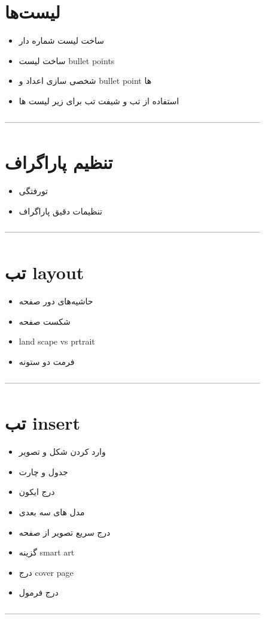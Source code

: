 \section{لیست‌ها}
\begin{itemize}
\item
ساخت لیست شماره دار
\item
ساخت لیست bullet points
\item
شخصی سازی اعداد و bullet point ها
\item
استفاده از تب و شیفت تب برای زیر لیست ها
\end{itemize}
--------------------------------------------------------------------------------------------
\section{تنظیم پاراگراف}
\begin{itemize}
\item
تورفتگی
\item
تنظیمات دقیق پاراگراف
\end{itemize}
--------------------------------------------------------------------------------------------
\section{تب layout}
\begin{itemize}
\item
حاشیه‌های دور صفحه
\item
شکست صفحه
\item
land scape vs prtrait
\item
فرمت دو ستونه
\end{itemize}
--------------------------------------------------------------------------------------------
\section{تب insert}
\begin{itemize}
\item
وارد کردن شکل و تصویر
\item
جدول و چارت
\item
درج ایکون
\item
مدل های سه بعدی
\item
درج سریع تصویر از صفحه
\item
گزینه smart art
\item
درج cover page
\item
درج فرمول
\end{itemize}
--------------------------------------------------------------------------------------------
